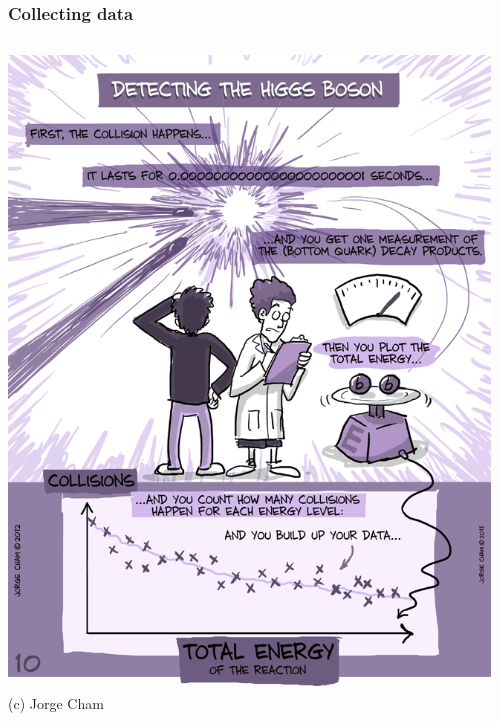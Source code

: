 \documentclass{beamer}
\begin{document}
\begin{frame}
    \frametitle{Collecting data}

    \begin{columns}
        \begin{column}{0.55\textwidth}
            \centering
            \includegraphics[width=\textwidth]{figures/phd2.png}\\
            {\scriptsize (c) Jorge Cham}
        \end{column}
        \begin{column}{0.4\textwidth}
            \centering

\end{column}
\end{columns}
\end{frame}
\end{document}
